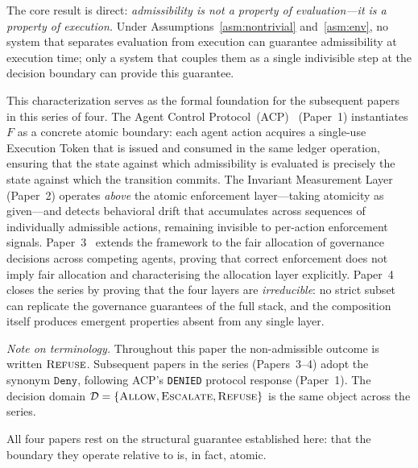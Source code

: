 \documentclass[11pt]{article}
\theoremstyle{plain}
\theoremstyle{definition}
\theoremstyle{remark}
\newcommand{\Allow}{\textsc{Allow}}
\newcommand{\Refuse}{\textsc{Refuse}}
\newcommand{\Escalate}{\textsc{Escalate}}
\begin{document}
The core result is direct: \emph{admissibility is not a property of
evaluation---it is a property of execution.}  Under
Assumptions~\ref{asm:nontrivial} and~\ref{asm:env}, no system that separates
evaluation from execution can guarantee admissibility at execution time; only
a system that couples them as a single indivisible step at the decision
boundary can provide this guarantee.

This characterization serves as the formal foundation for the subsequent papers
in this series of four.  The Agent Control Protocol~(ACP)~\cite{acp26}
(Paper~1) instantiates $F$ as a concrete atomic boundary: each agent action
acquires a single-use Execution Token that is issued and consumed in the same
ledger operation, ensuring that the state against which admissibility is
evaluated is precisely the state against which the transition commits.  The
Invariant Measurement Layer~\cite{iml26} (Paper~2) operates \emph{above} the
atomic enforcement layer---taking atomicity as given---and detects behavioral
drift that accumulates across sequences of individually admissible actions,
remaining invisible to per-action enforcement signals.  Paper~3~\cite{fairgov26} extends the framework to the fair allocation of
governance decisions across competing agents, proving that correct enforcement
does not imply fair allocation and characterising the allocation layer
explicitly.  Paper~4~\cite{fernandez2026comp} closes the series by proving
that the four layers are \emph{irreducible}: no strict subset can replicate the
governance guarantees of the full stack, and the composition itself produces
emergent properties absent from any single layer.

\medskip
\noindent\textit{Note on terminology.}\enspace
Throughout this paper the non-admissible outcome is written $\Refuse$.
Subsequent papers in the series (Papers~3--4) adopt the synonym
$\texttt{Deny}$, following ACP's \texttt{DENIED} protocol response
(Paper~1).  The decision domain
$\mathcal{D} = \{\Allow, \Escalate, \Refuse\}$ is the same object across the
series.

All four papers rest on the structural guarantee established here: that the
boundary they operate relative to is, in fact, atomic.



\end{document}
